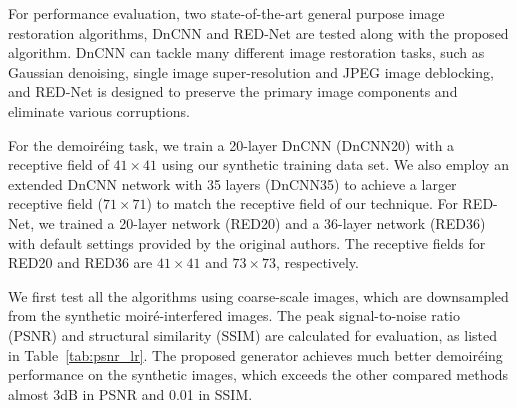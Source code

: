 \documentclass[10pt,twocolumn,letterpaper]{article}
\begin{document}
For performance evaluation, two state-of-the-art general purpose image
restoration algorithms, DnCNN \cite{zhang2017beyond} and RED-Net
\cite{mao2016image} are tested along with the proposed algorithm.
DnCNN can tackle many different image restoration tasks, such as
Gaussian denoising, single image super-resolution and JPEG image
deblocking, and RED-Net is designed to preserve the primary image
components and eliminate various corruptions.

For the demoir\'eing task, we train a 20-layer DnCNN (DnCNN20) with a
receptive field of $41\times 41$ using our synthetic training data
set.  We also employ an extended DnCNN network with 35 layers
(DnCNN35) to achieve a larger receptive field ($71\times 71$) to match
the receptive field of our technique.  For RED-Net, we trained a
20-layer network (RED20) and a 36-layer network (RED36) with default
settings provided by the original authors.  The receptive fields for
RED20 and RED36 are $41\times 41$ and $73\times 73$, respectively.

\begin{table}
  \caption{Average PSNR and SSIM for synthetic data for coarse-scale
    images.}
  \label{tab:psnr_lr}
  \centering
\end{table}

We first test all the algorithms using coarse-scale images, which are
downsampled from the synthetic moir\'e-interfered images.  The peak
signal-to-noise ratio (PSNR) and structural similarity (SSIM) are
calculated for evaluation, as listed in Table~\ref{tab:psnr_lr}.  The
proposed generator achieves much better demoir\'eing performance on
the synthetic images, which exceeds the other compared methods almost
3dB in PSNR and 0.01 in SSIM.
\end{document}
